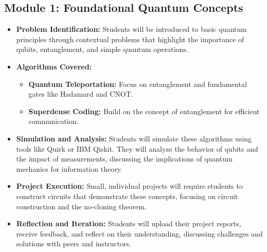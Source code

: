 \subsection{Module 1: Foundational Quantum Concepts}

\begin{itemize}
    \item \textbf{Problem Identification:} Students will be introduced to basic quantum principles through contextual problems that highlight the importance of qubits, entanglement, and simple quantum operations.
    \item \textbf{Algorithms Covered:}
    \begin{itemize}
        \item \textbf{Quantum Teleportation:} Focus on entanglement and fundamental gates like Hadamard and CNOT.
        \item \textbf{Superdense Coding:} Build on the concept of entanglement for efficient communication.
    \end{itemize}
    \item \textbf{Simulation and Analysis:} Students will simulate these algorithms using tools like Quirk or IBM Qiskit. They will analyze the behavior of qubits and the impact of measurements, discussing the implications of quantum mechanics for information theory.
    \item \textbf{Project Execution:} Small, individual projects will require students to construct circuits that demonstrate these concepts, focusing on circuit construction and the no-cloning theorem.
    \item \textbf{Reflection and Iteration:} Students will upload their project reports, receive feedback, and reflect on their understanding, discussing challenges and solutions with peers and instructors.
\end{itemize}


